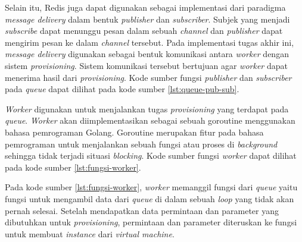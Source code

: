 



Selain itu, Redis juga dapat digunakan sebagai implementasi dari paradigma \emph{message delivery}
dalam bentuk \emph{publisher} dan \emph{subscriber}. Subjek yang menjadi
\emph{subscribe} dapat menunggu pesan dalam sebuah \emph{channel} dan 
\emph{publisher} dapat mengirim pesan ke dalam \emph{channel} tersebut.
Pada implementasi tugas akhir ini, \emph{message delivery} digunakan
sebagai bentuk komunikasi antara \emph{worker} dengan sistem \emph{provisioning}.
Sistem komunikasi tersebut bertujuan agar \emph{worker} dapat menerima hasil
dari \emph{provisioning}. Kode sumber fungsi \emph{publisher} dan \emph{subscriber}
pada \emph{queue} dapat dilihat pada kode sumber \ref{lst:queue-pub-sub}.



\emph{Worker} digunakan untuk menjalankan tugas \emph{provisioning}
yang terdapat pada \emph{queue}. \emph{Worker} akan diimplementasikan
sebagai sebuah goroutine menggunakan bahasa pemrograman Golang. Goroutine merupakan
fitur pada bahasa pemrograman untuk menjalankan sebuah fungsi atau proses
di \emph{background} sehingga tidak terjadi situasi \emph{blocking}. Kode sumber
fungsi \emph{worker} dapat dilihat pada kode sumber \ref{lst:fungsi-worker}.

\clearpage



Pada kode sumber \ref{lst:fungsi-worker}, \emph{worker} memanggil fungsi
dari \emph{queue} yaitu fungsi untuk mengambil data dari \emph{queue}
di dalam sebuah \emph{loop} yang tidak akan pernah selesai. Setelah
mendapatkan data permintaan dan parameter yang dibutuhkan untuk \emph{provisioning},
permintaan dan parameter diteruskan ke fungsi untuk membuat \emph{instance}
dari \emph{virtual machine}.

%

